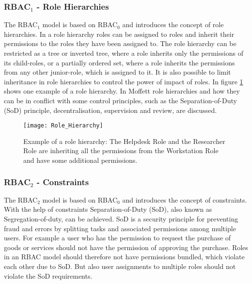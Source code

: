         \subsubsection{RBAC$_1$ - Role Hierarchies}
        \label{sec:rolehierarchies}
            The RBAC$_1$ model is based on RBAC$_0$ and introduces the concept of role hierarchies. In a role hierarchy roles can be assigned to roles and inherit their permissions to the roles they have been assigned to. The role hierarchy can be restricted as a tree or inverted tree, where a role inherits only the permissions of its child-roles, or a partially ordered set, where a role inherits the permissions from any other junior-role, which is assigned to it. It is also possible to limit inheritance in role hierarchies to control the power of impact of roles. In figure \ref{fig:rolehierarchies} shows one example of a role hierarchy.
            In Moffett\cite{Moffett:1998} role hierarchies and how they can be in conflict with some control principles, such as the Separation-of-Duty (SoD) principle, decentralisation, supervision and review, are discussed.
            \begin{figure}[H]
                \centering
                \texttt{[image: Role\_Hierarchy]}
                \caption{Example of a role hierarchy: The Helpdesk Role and the Researcher Role are inheriting all the permissions from the Workstation Role and have some additional permissions.}
                \label{fig:rolehierarchies}
            \end{figure}
        \subsubsection{RBAC$_2$ - Constraints}
        \label{sec:rbac2}
            The RBAC$_2$ model is based on RBAC$_0$ and introduces the concept of constraints. With the help of constraints Separation-of-Duty (SoD), also known as Segregation-of-duty, can be achieved. SoD is a security principle for preventing fraud and errors by splitting tasks and associated permissions among multiple users. For example a user who has the permission to request the purchase of goods or services should not have the permission of approving the purchase. Roles in an RBAC model should therefore not have permissions bundled, which violate each other due to SoD. But also user assignments to multiple roles should not violate the SoD requirements.
